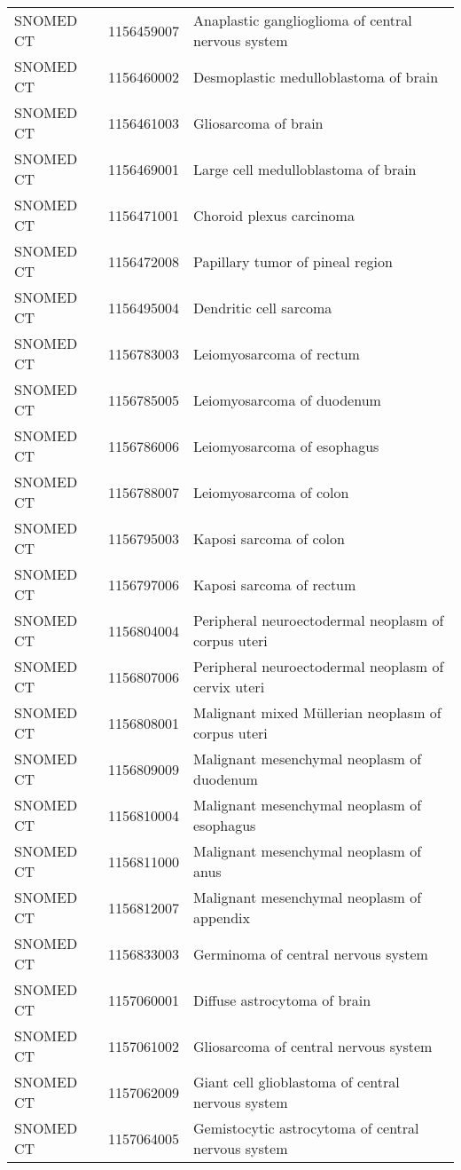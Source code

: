 \begin{longtable}{p{}p{}p{}}
  SNOMED CT & 1156459007 & Anaplastic ganglioglioma of central nervous system \\ 
  SNOMED CT & 1156460002 & Desmoplastic medulloblastoma of brain \\ 
  SNOMED CT & 1156461003 & Gliosarcoma of brain \\ 
  SNOMED CT & 1156469001 & Large cell medulloblastoma of brain \\ 
  SNOMED CT & 1156471001 & Choroid plexus carcinoma \\ 
  SNOMED CT & 1156472008 & Papillary tumor of pineal region \\ 
  SNOMED CT & 1156495004 & Dendritic cell sarcoma \\ 
  SNOMED CT & 1156783003 & Leiomyosarcoma of rectum \\ 
  SNOMED CT & 1156785005 & Leiomyosarcoma of duodenum \\ 
  SNOMED CT & 1156786006 & Leiomyosarcoma of esophagus \\ 
  SNOMED CT & 1156788007 & Leiomyosarcoma of colon \\ 
  SNOMED CT & 1156795003 & Kaposi sarcoma of colon \\ 
  SNOMED CT & 1156797006 & Kaposi sarcoma of rectum \\ 
  SNOMED CT & 1156804004 & Peripheral neuroectodermal neoplasm of corpus uteri \\ 
  SNOMED CT & 1156807006 & Peripheral neuroectodermal neoplasm of cervix uteri \\ 
  SNOMED CT & 1156808001 & Malignant mixed Müllerian neoplasm of corpus uteri \\ 
  SNOMED CT & 1156809009 & Malignant mesenchymal neoplasm of duodenum \\ 
  SNOMED CT & 1156810004 & Malignant mesenchymal neoplasm of esophagus \\ 
  SNOMED CT & 1156811000 & Malignant mesenchymal neoplasm of anus \\ 
  SNOMED CT & 1156812007 & Malignant mesenchymal neoplasm of appendix \\ 
  SNOMED CT & 1156833003 & Germinoma of central nervous system \\ 
  SNOMED CT & 1157060001 & Diffuse astrocytoma of brain \\ 
  SNOMED CT & 1157061002 & Gliosarcoma of central nervous system \\ 
  SNOMED CT & 1157062009 & Giant cell glioblastoma of central nervous system \\ 
  SNOMED CT & 1157064005 & Gemistocytic astrocytoma of central nervous system \\ 

\end{longtable}
